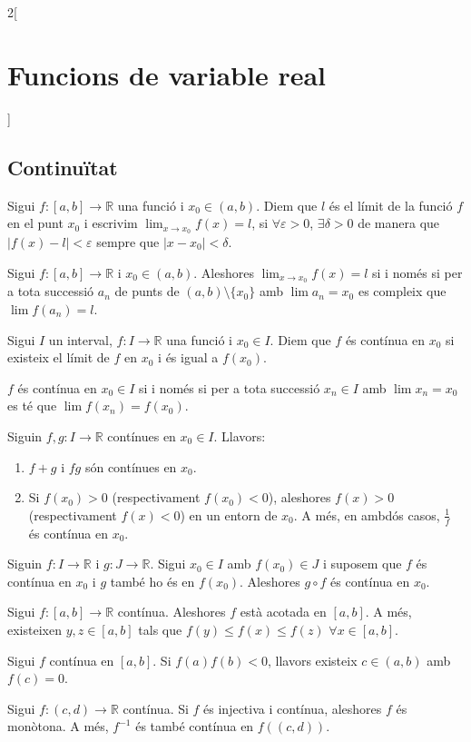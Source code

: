 \documentclass[../../../main.tex]{subfiles}
\begin{document}
\begin{multicols}{2}[\section{Funcions de variable real}]
\subsection{Continuïtat}
\begin{definition}
Sigui $f:[a,b]\rightarrow\mathbb{R}$ una funció i $x_0\in(a,b)$. Diem que $l$ és el límit de la funció $f$ en el punt $x_0$ i escrivim $\lim_{x\to x_0}f(x)=l$, si $\forall\varepsilon>0$, $\exists\delta>0$ de manera que $|f(x)-l|<\varepsilon$ sempre que $|x-x_0|<\delta$.
\end{definition}
\begin{lemma}
Sigui $f:[a,b]\rightarrow\mathbb{R}$ i $x_0\in(a,b)$. Aleshores $\lim_{x\to x_0}f(x)=l$ si i només si per a tota successió $a_n$ de punts de $(a,b)\setminus\{x_0\}$ amb $\lim a_n=x_0$ es compleix que $\lim f(a_n)=l$.
\end{lemma}
\begin{definition}
Sigui $I$ un interval, $f:I\rightarrow\mathbb{R}$ una funció i $x_0\in I$. Diem que $f$ és contínua en $x_0$ si existeix el límit de $f$ en $x_0$ i és igual a $f(x_0)$.
\end{definition}
\begin{lemma}
$f$ és contínua en $x_0\in I$ si i només si per a tota successió $x_n\in I$ amb $\lim x_n=x_0$ es té que $\lim f(x_n)=f(x_0)$.
\end{lemma}
\begin{prop}
Siguin $f,g:I\rightarrow \mathbb{R}$ contínues en $x_0\in I$. Llavors:
\begin{enumerate}
    \item $f+g$ i $fg$ són contínues en $x_0$.
    \item Si $f(x_0)>0$ (respectivament $f(x_0)<0$), aleshores $f(x)>0$ (respectivament $f(x)<0$) en un entorn de $x_0$. A més, en ambdós casos, $\frac{1}{f}$ és contínua en $x_0$.
\end{enumerate}
\end{prop}
\begin{prop}
Siguin $f:I\rightarrow\mathbb{R}$ i $g:J\rightarrow\mathbb{R}$. Sigui $x_0\in I$ amb $f(x_0)\in J$ i suposem que $f$ és contínua en $x_0$ i $g$ també ho és en $f(x_0)$. Aleshores $g\circ f$ és contínua en $x_0$.
\end{prop}
\begin{theorem}
Sigui $f:[a,b]\rightarrow\mathbb{R}$ contínua. Aleshores $f$ està acotada en $[a,b]$. A més, existeixen $y,z\in[a,b]$ tals que $f(y)\leq f(x)\leq f(z)$ $\forall x\in [a,b]$. 
\end{theorem}
\begin{theorem}
Sigui $f$ contínua en $[a,b]$. Si $f(a)f(b)<0$, llavors existeix $c\in(a,b)$ amb $f(c)=0$. 
\end{theorem}
\begin{theorem}
Sigui $f:(c,d)\rightarrow\mathbb{R}$ contínua. Si $f$ és injectiva i contínua, aleshores $f$ és monòtona. A més, $f^{-1}$ és també contínua en $f((c,d))$.
\end{theorem}

\end{multicols}
\end{document}
